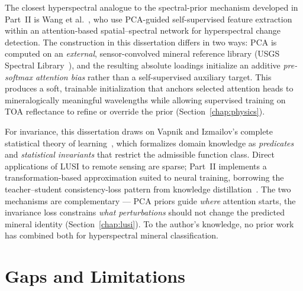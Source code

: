 \documentclass[11pt]{report}
\begin{document}
The closest hyperspectral analogue to the spectral-prior mechanism developed in Part~II is Wang et al.~\cite{wang2021attention_pca_guided}, who use PCA-guided self-supervised feature extraction within an attention-based spatial--spectral network for hyperspectral change detection. The construction in this dissertation differs in two ways: PCA is computed on an \emph{external}, sensor-convolved mineral reference library (USGS Spectral Library~\cite{kokaly2017usgs}), and the resulting absolute loadings initialize an additive \emph{pre-softmax attention bias} rather than a self-supervised auxiliary target. This produces a soft, trainable initialization that anchors selected attention heads to mineralogically meaningful wavelengths while allowing supervised training on TOA reflectance to refine or override the prior (Section~\ref{chap:physics}).

For invariance, this dissertation draws on Vapnik and Izmailov's complete statistical theory of learning~\cite{vapnik2020}, which formalizes domain knowledge as \emph{predicates} and \emph{statistical invariants} that restrict the admissible function class. Direct applications of LUSI to remote sensing are sparse; Part~II implements a transformation-based approximation suited to neural training, borrowing the teacher--student consistency-loss pattern from knowledge distillation~\cite{hinton2015distilling}. The two mechanisms are complementary --- PCA priors guide \emph{where} attention starts, the invariance loss constrains \emph{what perturbations} should not change the predicted mineral identity (Section~\ref{chap:lusi}). To the author's knowledge, no prior work has combined both for hyperspectral mineral classification.

\section{Gaps and Limitations}
\end{document}
